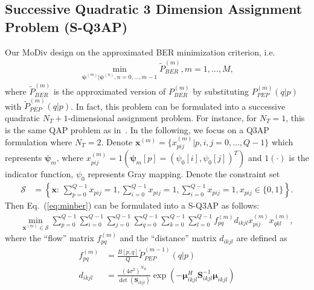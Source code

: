 \documentclass[journal,draftcls,onecolumn,12pt,twoside]{IEEEtran}
\begin{document}
\subsection{Successive Quadratic 3 Dimension Assignment Problem (S-Q3AP)}
\label{ssec:q3ap}
Our MoDiv design on the approximated BER minimization criterion,
i.e.
\begin{align}
    \min_{\bm{\psi}^{(m)}|\bm{\psi}^{(n)},
    n=0,\ldots,m-1}\tilde{P}_{BER}^{(m)},m=1,\ldots,M,\label{eq:minber}
\end{align}
where $\tilde{P}_{BER}^{(m)}$ is the approximated version of
$P_{BER}^{(m)}$ by substituting $P_{PEP}^{(m)}(q|p)$ with
$\tilde{P}_{PEP}^{(m)}(q|p)$. In fact, this problem can be formulated into a
successive quadratic $N_T + 1$-dimensional assignment problem. For instance, for
$N_T=1$, this is the same QAP problem as in~\cite{samra2005symbol}. In the following, we
focus on a Q3AP formulation where $N_T = 2$. Denote $\mathbf{x}^{(m)} =
\{x_{pij}^{(m)}|p,i,j=0,\ldots,Q-1\}$ which represents $\bm{\psi}_m$, where
$x_{pij}^{(m)} = 1(\bm{\psi}_m[p] =
(\psi_0[i], \psi_0[j])^T)$ and $1(\cdot)$ is the indicator function, $\psi_0$
represents Gray mapping. Denote the constraint set
\begin{subequations}
  \begin{align}
    \mathcal{S} & = \left\{\mathbf{x}:\,\sum_{p=0}^{Q-1}x_{pij} = 1,
    \sum_{i=0}^{Q-1}x_{pij} = 1, \sum_{i=0}^{Q-1}x_{pij} = 1, x_{pij}\in\{0,
    1\}\right\}.
    \label{eq:constraint}
  \end{align}
\end{subequations}
Then Eq.~(\ref{eq:minber}) can be formulated into a S-Q3AP as follows:
\begin{align}
  \min_{\mathbf{x}^{(m)}\in \mathcal{S}}
  \sum_{p=0}^{Q-1}\sum_{i=0}^{Q-1}\sum_{j=0}^{Q-1}
  \sum_{q=0}^{Q-1}\sum_{k=0}^{Q-1}\sum_{l=0}^{Q-1}
  f_{pq}^{(m)}d_{ikjl}x_{pij}^{(m)}x_{qkl}^{(m)},
  \label{eq:SQ3AP}
\end{align}
where the ``flow'' matrix $f_{pq}^{(m)}$ and the ``distance'' matrix $d_{ikjl}$
are defined as
\begin{subequations}
  \begin{align}
    f_{pq}^{(m)} & = \frac{B[p,q]}{Q}\tilde{P}_{PEP}^{(m-1)}(q|p) \\
    d_{ikjl} & = \frac{(4\sigma^2)^{N_R}}{\det(\mathbf{S}_{ikjl})}
        \exp\left(-\bm{\mu}_{ikjl}^H\mathbf{S}_{ikjl}^{-1}\bm{\mu}_{ikjl}\right)
  \end{align}
\end{subequations}
\end{document}
